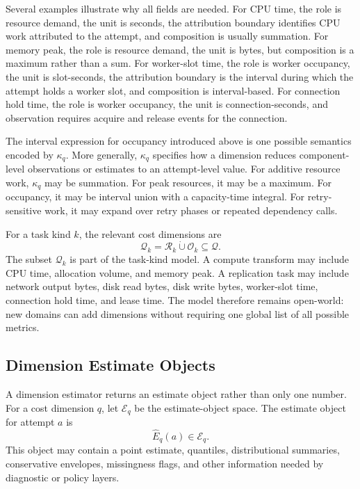Several examples illustrate why all fields are needed. For CPU time, the role is
resource demand, the unit is seconds, the attribution boundary identifies CPU
work attributed to the attempt, and composition is usually summation. For memory
peak, the role is resource demand, the unit is bytes, but composition is a
maximum rather than a sum. For worker-slot time, the role is worker occupancy,
the unit is slot-seconds, the attribution boundary is the interval during which
the attempt holds a worker slot, and composition is interval-based. For
connection hold time, the role is worker occupancy, the unit is
connection-seconds, and observation requires acquire and release events for the
connection.

The interval expression for occupancy introduced above is one possible
semantics encoded by $\kappa_q$. More generally, $\kappa_q$ specifies how a
dimension reduces component-level observations or estimates to an attempt-level
value. For additive resource work, $\kappa_q$ may be summation. For peak
resources, it may be a maximum. For occupancy, it may be interval union with a
capacity-time integral. For retry-sensitive work, it may expand over retry
phases or repeated dependency calls.

For a task kind $k$, the relevant cost dimensions are
\[
\mathcal{Q}_k
=
\mathcal{R}_k
\dot{\cup}
\mathcal{O}_k
\subseteq
\mathcal{Q}.
\]
The subset $\mathcal{Q}_k$ is part of the task-kind model. A compute transform
may include CPU time, allocation volume, and memory peak. A replication task may
include network output bytes, disk read bytes, disk write bytes, worker-slot
time, connection hold time, and lease time. The model therefore remains
open-world: new domains can add dimensions without requiring one global list of
all possible metrics.

\subsection{Dimension Estimate Objects}
\label{sec:cost-dimension-estimate-objects}

A dimension estimator returns an estimate object rather than only one number.
For a cost dimension $q$, let $\mathcal{E}_q$ be the estimate-object space. The
estimate object for attempt $a$ is
\[
\widehat{E}_q(a) \in \mathcal{E}_q.
\]
This object may contain a point estimate, quantiles, distributional summaries,
conservative envelopes, missingness flags, and other information needed by
diagnostic or policy layers.

